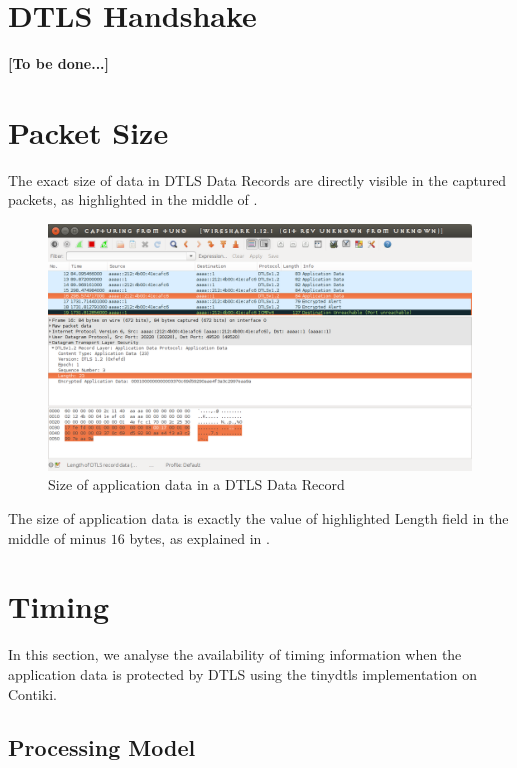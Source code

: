 \section{DTLS Handshake}

\textbf{[To be done...]}

\section{Packet Size}

The exact size of data in DTLS Data Records are directly visible in the captured packets, as highlighted in the middle of .

\begin{figure}[ht!]
	\center
	\includegraphics[width=.9\linewidth]{fig/dtlslength.png}
	\caption{Size of application data in a DTLS Data Record}
	\label{Fig: Size of application data in a DTLS Data Record}
\end{figure}

The size of application data is exactly the value of highlighted Length field in the middle of  minus $16$ bytes, as explained in \cite{rfc5116}.


\section{Timing}

In this section, we analyse the availability of timing information when the application data is protected by DTLS using the tinydtls implementation on Contiki.

\subsection{Processing Model}


